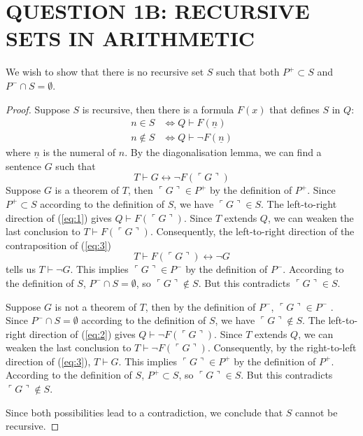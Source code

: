 \section*{QUESTION 1B: RECURSIVE SETS IN ARITHMETIC}

We wish to show that there is no recursive set $S$ such that both $P^+ \subset S$ and $P^- \cap S = \emptyset$.

\begin{proof}
Suppose $S$ is recursive, then there is a formula $F(x)$ that defines $S$ in $Q$:
\begin{align}
   n \in S &\iff Q \vdash F(\underline{n}) \label{eq:1} \\
   n \not\in S &\iff Q \vdash \neg F(\underline{n}) \label{eq:2}
\end{align}
where $\underline{n}$ is the numeral of $n$. By the diagonalisation lemma, we can find a sentence $G$ such that
\begin{equation}
   T \vdash G \leftrightarrow \neg F(\ulcorner G \urcorner) \label{eq:3}
\end{equation}
Suppose $G$ is a theorem of $T$, then $\ulcorner G \urcorner \in P^+$ by the definition of $P^+$. Since $P^+ \subset S$ according to the definition of $S$, we have $\ulcorner G \urcorner \in S$. The left-to-right direction of (\ref{eq:1}) gives $Q \vdash F(\ulcorner G \urcorner)$. Since $T$ extends $Q$, we can weaken the last conclusion to $T \vdash F(\ulcorner G \urcorner)$. Consequently, the left-to-right direction of the contraposition of (\ref{eq:3})
\begin{equation*}
   T \vdash F(\ulcorner G \urcorner) \leftrightarrow \neg G
\end{equation*}
tells us $T \vdash \neg G$. This implies $\ulcorner G \urcorner \in P^-$ by the definition of $P^-$. According to the definition of $S$, $P^- \cap S = \emptyset$, so $\ulcorner G \urcorner \not\in S$. But this contradicts $\ulcorner G \urcorner \in S$.

Suppose $G$ is not a theorem of $T$, then by the definition of $P^-$, $\ulcorner G \urcorner \in P^-$ . Since $P^- \cap S = \emptyset$ according to the definition of $S$, we have $\ulcorner G \urcorner \not\in S$. The left-to-right direction of (\ref{eq:2}) gives $Q \vdash \neg F(\ulcorner G \urcorner)$. Since $T$ extends $Q$, we can weaken the last conclusion to $T \vdash \neg F(\ulcorner G \urcorner)$. Consequently, by the right-to-left direction of (\ref{eq:3}), $T \vdash G$. This implies $\ulcorner G \urcorner \in P^+$ by the definition of $P^+$. According to the definition of $S$, $P^+ \subset S$, so $\ulcorner G \urcorner \in S$. But this contradicts $\ulcorner G \urcorner \not\in S$.

Since both possibilities lead to a contradiction, we conclude that $S$ cannot be recursive.
\end{proof}